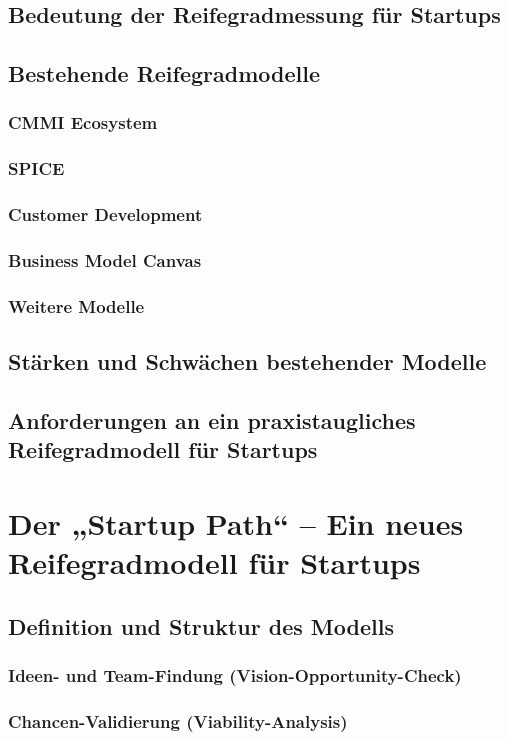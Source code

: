 \subsection{Bedeutung der Reifegradmessung für Startups}
\subsection{Bestehende Reifegradmodelle}
\subsubsection{CMMI Ecosystem}
\subsubsection{SPICE}
\subsubsection{Customer Development}
\subsubsection{Business Model Canvas}
\subsubsection{Weitere Modelle}
\subsection{Stärken und Schwächen bestehender Modelle}
\subsection{Anforderungen an ein praxistaugliches Reifegradmodell für Startups}

\section{Der „Startup Path“ – Ein neues Reifegradmodell für Startups}
\subsection{Definition und Struktur des Modells}
\subsubsection{Ideen- und Team-Findung (Vision-Opportunity-Check)}
\subsubsection{Chancen-Validierung (Viability-Analysis)}
